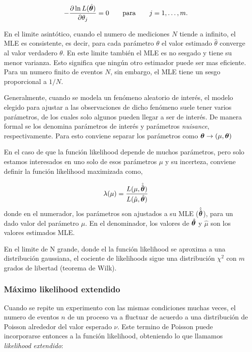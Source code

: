 \begin{equation}
  - \frac{\partial \ln L(\hat{\bm{\theta}})}{\partial \theta_j} = 0 \qquad \text{para} \qquad j = 1,\ldots,m.
\end{equation}

En el limite asintótico, cuando el numero de mediciones $N$ tiende a infinito, el MLE
es consistente, es decir, para cada parámetro $\theta$ el valor estimado $\hat{\theta}$
converge al valor verdadero $\theta$. En este limite también el MLE es no sesgado y tiene
su menor varianza. Esto significa que ningún otro estimador puede ser mas eficiente. Para
un numero finito de eventos $N$, sin embargo, el MLE tiene un sesgo proporcional a $1/N$.


Generalmente, cuando se modela un fenómeno aleatorio de interés, el modelo elegido
para ajustar a las observaciones de dicho fenómeno suele tener varios parámetros,
de los cuales solo algunos pueden llegar a ser de interés. De manera formal se los
denomina parámetros de interés y parámetros \emph{nuisance}, respectivamente.
Para esto conviene separar los parámetros como $\bm{\theta} \rightarrow (\mu, \bm{\theta})$

En el caso de que la función likelihood depende de muchos parámetros, pero solo estamos
interesados en uno solo de esos parámetros $\mu$ y su incerteza, conviene definir la
funci\'on likelihood maximizada  como,

\begin{equation}
  \lambda(\mu) = \frac{L(\mu,\hat{\hat{\bm{\theta}}})}{L(\hat{\mu},\hat{\bm{\theta}})}
\end{equation}
%
donde en el numerador, los parámetros {\btheta} son ajustados a su MLE ($\hat{\hat{\bm{\theta}}}$),
para un dado valor del parámetro $\mu$. En el denominador, los valores de $\hat{\bm{\theta}}$
y $\hat{\mu}$ son los valores estimados MLE.

En el limite de N grande, donde el la función likelihood se aproxima a una distribución
gaussiana, el cociente de likelihoods sigue una distribución $\chi^2$ con $m$ grados de
libertad (teorema de Wilk).


\subsubsection{Máximo likelihood extendido}

Cuando se repite un experimento con las mismas condiciones muchas veces, el numero
de eventos $n$ de un proceso va a fluctuar de acuerdo a una distribución de Poisson
alrededor del valor esperado $\nu$. Este termino de Poisson puede incorporarse entonces
a la función likelihood, obteniendo lo que llamamos \emph{likelihood extendido}:

